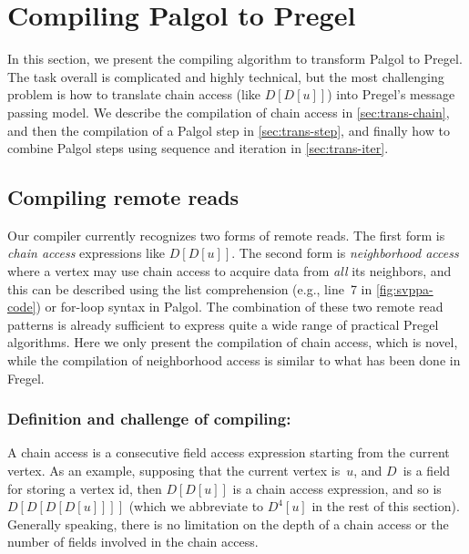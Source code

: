 \documentclass{sokendai_thesis} %
\begin{document}
\section{Compiling Palgol to Pregel}
\label{sec:compilation}

In this section, we present the compiling algorithm to transform Palgol to Pregel.
The task overall is complicated and highly technical, but the most challenging problem is how to translate chain access (like $D[D[u]]$) into Pregel's message passing model.
We describe the compilation of chain access in \autoref{sec:trans-chain}, and then the compilation of a Palgol step in \autoref{sec:trans-step}, and finally how to combine Palgol steps using sequence and iteration in \autoref{sec:trans-iter}.

\subsection{Compiling remote reads}
\label{sec:trans-chain}

Our compiler currently recognizes two forms of remote reads.
The first form is \emph{chain access} expressions like $D[D[u]]$.
The second form is \emph{neighborhood access} where a vertex may use chain access to acquire data from \emph{all} its neighbors, and this can be described using the list comprehension (e.g., line~7 in \autoref{fig:svppa-code}) or for-loop syntax in Palgol.
The combination of these two remote read patterns is already sufficient to express quite a wide range of practical Pregel algorithms.
Here we only present the compilation of chain access, which is novel, while the compilation of neighborhood access is similar to what has been done in Fregel.

\subsubsection{Definition and challenge of compiling:}
A chain access is a consecutive field access expression starting from the current vertex.
As an example, supposing that the current vertex is~$u$, and $D$~is a field for storing a vertex id, then $D[D[u]]$ is a chain access expression, and so is $D[D[D[D[u]]]]$ (which we abbreviate to $D^4[u]$ in the rest of this section).
Generally speaking, there is no limitation on the depth of a chain access or the number of fields involved in the chain access.
\end{document}
